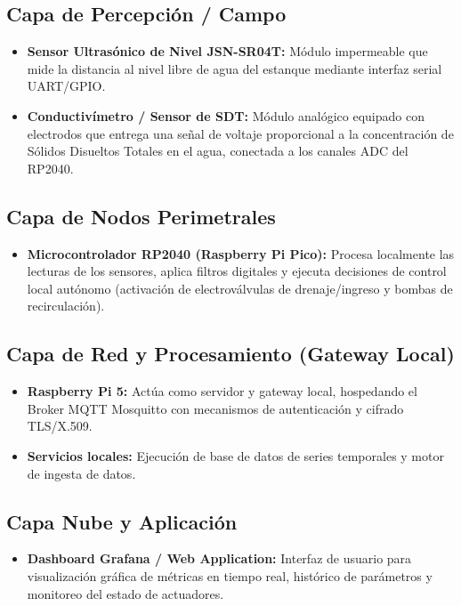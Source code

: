 \documentclass[12pt,letterpaper]{article}     %
\begin{document}
\subsection{Capa de Percepción / Campo}
\begin{itemize}
    \item \textbf{Sensor Ultrasónico de Nivel JSN-SR04T:} Módulo impermeable que mide la distancia al nivel libre de agua del estanque mediante interfaz serial UART/GPIO.
    \item \textbf{Conductivímetro / Sensor de SDT:} Módulo analógico equipado con electrodos que entrega una señal de voltaje proporcional a la concentración de Sólidos Disueltos Totales en el agua, conectada a los canales ADC del RP2040.
\end{itemize}

\subsection{Capa de Nodos Perimetrales}
\begin{itemize}
    \item \textbf{Microcontrolador RP2040 (Raspberry Pi Pico):} Procesa localmente las lecturas de los sensores, aplica filtros digitales y ejecuta decisiones de control local autónomo (activación de electroválvulas de drenaje/ingreso y bombas de recirculación).
\end{itemize}

\subsection{Capa de Red y Procesamiento (Gateway Local)}
\begin{itemize}
    \item \textbf{Raspberry Pi 5:} Actúa como servidor y gateway local, hospedando el Broker MQTT Mosquitto con mecanismos de autenticación y cifrado TLS/X.509.
    \item \textbf{Servicios locales:} Ejecución de base de datos de series temporales y motor de ingesta de datos.
\end{itemize}

\subsection{Capa Nube y Aplicación}
\begin{itemize}
    \item \textbf{Dashboard Grafana / Web Application:} Interfaz de usuario para visualización gráfica de métricas en tiempo real, histórico de parámetros y monitoreo del estado de actuadores.
\end{itemize}
\end{document}
